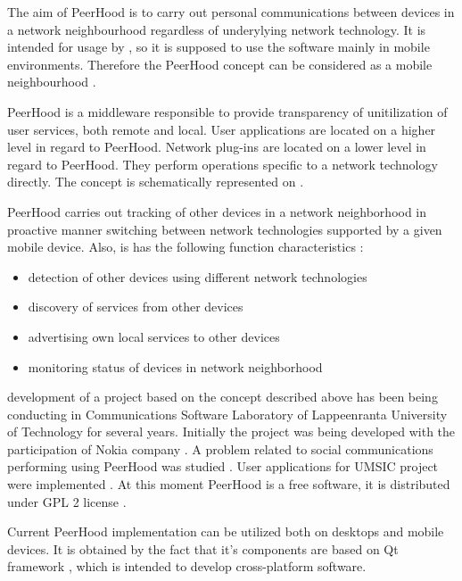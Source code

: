 %
The aim of PeerHood is to carry out personal communications between devices in a network neighbourhood regardless of underylying network technology. 
%
It is intended for usage by , so it is supposed to use the software mainly in mobile environments. 
%
Therefore the PeerHood concept can be considered as a mobile  neighbourhood . 

%
PeerHood is a middleware responsible to provide transparency of unitilization of user services, both remote and local. 
%
User applications are located on a higher level in regard to PeerHood. 
%
Network plug-ins are located on a lower level in regard to PeerHood. 
%
They perform operations specific to a network technology directly. 
%
The concept is schematically represented on . 


%
PeerHood carries out tracking of other devices in a network neighborhood in proactive manner switching between network technologies supported by a given mobile device. 
%
Also, is has the following function characteristics : 
\begin{itemize}
	\item detection of other devices using different network technologies
	\item discovery of services from other devices
	\item advertising own local services to other devices
	\item monitoring status of devices in network neighborhood
\end{itemize}

%
 development of a project based on the concept described above has been being conducting in Communications Software Laboratory of Lappeenranta University of Technology for several years. 
%
Initially the project was being developed with the participation of Nokia company . 
%
A problem related to social communications performing using PeerHood was studied . 
%
User applications for UMSIC project  were implemented . 
%
At this moment PeerHood is a free software, it is distributed under GPL 2 license  . 

%
Current PeerHood implementation can be utilized both on desktops and mobile devices. 
%
It is obtained by the fact that it's components are based on Qt framework , which is intended to develop cross-platform software. 
